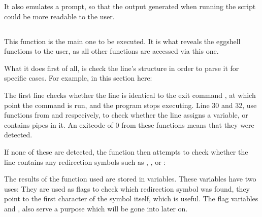 \documentclass[12pt, a4paper]{report}
\begin{document}
                It also emulates a prompt, so that the output generated when running 
                the script could be more readable to the user.

                \clearpage
            
            \subsection{}
                This function is the main one to be executed.
                It is what reveals the eggshell functions to the user,
                as all other functions are accessed via this one.

                What it does first of all, is check the line's structure
                in order to parse it for specific cases. For example, in 
                this section here:
                
                \begingroup
                \fontsize{10pt}{10pt}\selectfont
                \endgroup
                The first line checks whether the line is identical to the
                exit command , at which point the  command
                is run, and the program stops executing. Line 30 and 32, use
                functions from  and  respecively,
                to check whether the line assigns a variable, or contains pipes in it.
                An exitcode of 0 from these functions means that they were detected.

                If none of these are detected, the function then attempts to check
                whether the line contains any redirection symbols such as \tx{>},
                \tx{>>}, \tx{<} or \tx{<<<}:

                \begingroup
                \fontsize{10pt}{10pt}\selectfont
                \endgroup
                The results of the  function used are stored in variables.
                These variables have two uses: They are used as flags to check which
                redirection symbol was found,  they point to the first character
                of the symbol itself, which is useful. The flag variables  and
                , also serve a purpose which will be gone into later on.

                \clearpage
\end{document}

